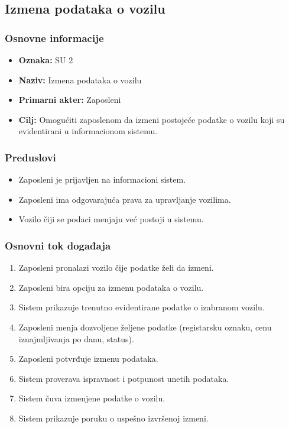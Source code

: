 \subsection{Izmena podataka o vozilu}

\subsubsection{Osnovne informacije}

\begin{itemize}
    \item \textbf{Oznaka:} SU 2
    \item \textbf{Naziv:} Izmena podataka o vozilu
    \item \textbf{Primarni akter:} Zaposleni
    \item \textbf{Cilj:} Omogućiti zaposlenom da izmeni postojeće podatke o vozilu koji su evidentirani u informacionom sistemu.
\end{itemize}

\subsubsection{Preduslovi}

\begin{itemize}
    \item Zaposleni je prijavljen na informacioni sistem.
    \item Zaposleni ima odgovarajuća prava za upravljanje vozilima.
    \item Vozilo čiji se podaci menjaju već postoji u sistemu.
\end{itemize}

\subsubsection{Osnovni tok događaja}

\begin{enumerate}
    \item Zaposleni pronalazi vozilo čije podatke želi da izmeni.
    \item Zaposleni bira opciju za izmenu podataka o vozilu.
    \item Sistem prikazuje trenutno evidentirane podatke o izabranom vozilu.
    \item Zaposleni menja dozvoljene željene podatke (registarsku oznaku, cenu iznajmljivanja po danu, status).
    \item Zaposleni potvrđuje izmenu podataka.
    \item Sistem proverava ispravnost i potpunost unetih podataka.
    \item Sistem čuva izmenjene podatke o vozilu.
    \item Sistem prikazuje poruku o uspešno izvršenoj izmeni.
\end{enumerate}

